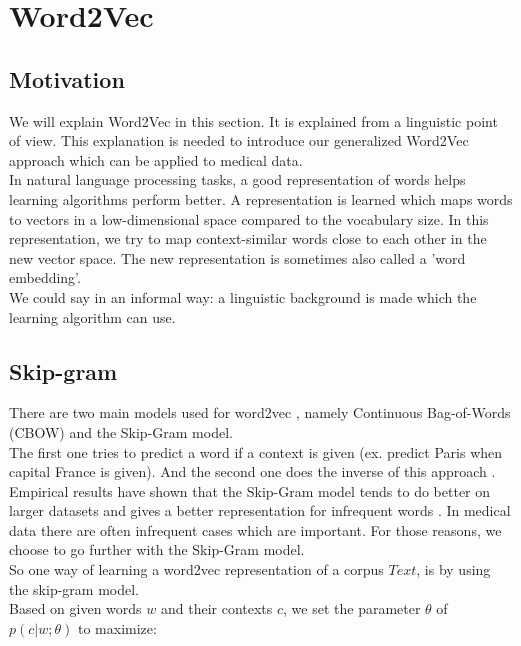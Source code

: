 \section{Word2Vec}
\label{sec:word2vec}

\subsection{Motivation}

We will explain Word2Vec in this section. It is explained from a linguistic point of view. This explanation is needed to introduce our generalized Word2Vec approach which can be applied to medical data. \\

In natural language processing tasks, a good representation of words helps learning algorithms perform better. A representation is learned which maps words to vectors in a low-dimensional space compared to the vocabulary size. In this representation, we try to map context-similar words close to each other in the new vector space. The new representation is sometimes also called a 'word embedding'. \\
We could say in an informal way: a linguistic background is made which the learning algorithm can use. \\


\subsection{Skip-gram}

There are two main models used for word2vec \cite{w2vOriginal:article}, namely Continuous Bag-of-Words (CBOW) and the Skip-Gram model. \\
The first one tries to predict a word if a context is given (ex. predict Paris when capital France is given). And the second one does the inverse of this approach \cite{w2vModels:article}. Empirical results have shown that the Skip-Gram model tends to do better on larger datasets \cite{w2vReason1:online} and gives a better representation for infrequent words \cite{w2vArchive:online}. In medical data there are often infrequent cases which are important. For those reasons, we choose to go further with the Skip-Gram model. \\

So one way of learning a word2vec representation of a corpus $Text$, is by using the skip-gram model. \\
Based on given words $w$ and their contexts $c$, we set the parameter $\theta$ of $p(c|w;\theta)$ to maximize:


